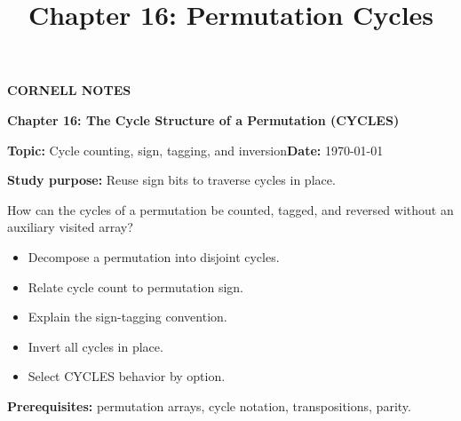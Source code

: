 \documentclass[10pt,letterpaper]{article}
\title{Chapter 16: Permutation Cycles}
\author{}
\date{}
\begin{document}
\maketitle
\begin{tcolorbox}[colback=Paper,colframe=Ink]{\small\bfseries\color{Teal}CORNELL NOTES}\par{\LARGE\bfseries Chapter 16: The Cycle Structure of a Permutation (CYCLES)}\par\medskip\textbf{Topic:} Cycle counting, sign, tagging, and inversion\hfill\textbf{Date:} \today\par\textbf{Study purpose:} Reuse sign bits to traverse cycles in place.\end{tcolorbox}
\begin{tcolorbox}[colback=Teal!5,colframe=Teal,title=Essential question]How can the cycles of a permutation be counted, tagged, and reversed without an auxiliary visited array?\end{tcolorbox}
\begin{tcolorbox}[colback=white,colframe=Mist,title=Learning objectives]\begin{itemize}\item Decompose a permutation into disjoint cycles.\item Relate cycle count to permutation sign.\item Explain the sign-tagging convention.\item Invert all cycles in place.\item Select CYCLES behavior by option.\end{itemize}\textbf{Prerequisites:} permutation arrays, cycle notation, transpositions, parity.\end{tcolorbox}
\end{document}
